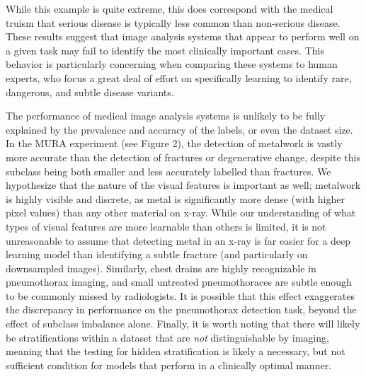 \documentclass[sigconf]{acmart}
\begin{document}
While this example is quite extreme, this does correspond with the medical truism that serious disease is typically less common than non-serious disease. 
These results suggest that image analysis systems that appear to perform well on a given task may fail to identify the most clinically important cases. 
This behavior is particularly concerning when comparing these systems to human experts, who focus a great deal of effort on specifically learning to identify rare, dangerous, and subtle disease variants.

The performance of medical image analysis systems is unlikely to be fully explained by the prevalence and accuracy of the labels, or even the dataset size. 
In the MURA experiment (see Figure 2), the detection of metalwork is vastly more accurate than the detection of fractures or degenerative change, despite this subclass being both smaller and less accurately labelled than fractures. 
We hypothesize that the nature of the visual features is important as well; metalwork is highly visible and discrete, as metal is significantly more dense (with higher pixel values) than any other material on x-ray. 
While our understanding of what types of visual features are more learnable than others is limited, it is not unreasonable to assume that detecting metal in an x-ray is far easier for a deep learning model than identifying a subtle fracture (and particularly on downsampled images).
Similarly, chest drains are highly recognizable in pneumothorax imaging, and small untreated pneumothoraces are subtle enough to be commonly missed by radiologists. 
It is possible that this effect exaggerates the discrepancy in performance on the pneumothorax detection task, beyond the effect of subclass imbalance alone.
Finally, it is worth noting that there will likely be stratifications within a dataset that are \textit{not} distinguishable by imaging, meaning that the testing for hidden stratification is likely a necessary, but not sufficient condition for models that perform in a clinically optimal manner.
\end{document}
